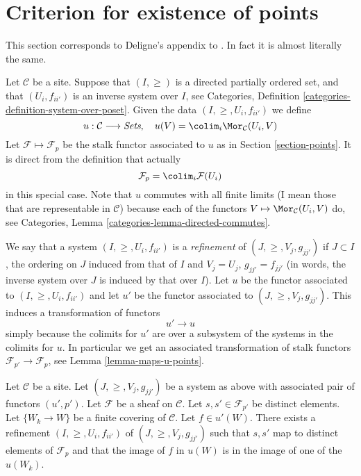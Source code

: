 \section{Criterion for existence of points}
\label{section-criterion-points}

\noindent
This section corresponds to Deligne's appendix to \cite[Expos\'e VI]{SGA4}.
In fact it is almost literally the same.

\medskip\noindent
Let $\mathcal{C}$ be a site.
Suppose that $(I, \geq)$ is a directed partially ordered set,
and that $(U_i, f_{ii'})$ is an inverse system over $I$, see
Categories, Definition \ref{categories-definition-system-over-poset}.
Given the data $(I, \geq, U_i, f_{ii'})$ we define
$$
u : \mathcal{C} \longrightarrow \textit{Sets}, \quad
u(V) = \colim_i \Mor_\mathcal{C}(U_i , V)
$$
Let $\mathcal{F} \mapsto \mathcal{F}_p$ be the stalk functor
associated to $u$ as in Section \ref{section-points}.
It is direct from the definition that actually
$$
\mathcal{F}_p = \colim_i \mathcal{F}(U_i)
$$
in this special case.
Note that $u$ commutes with all finite limits (I mean those that
are representable in $\mathcal{C}$) because
each of the functors $V \mapsto \Mor_\mathcal{C}(U_i , V)$
do, see Categories, Lemma \ref{categories-lemma-directed-commutes}.

\medskip\noindent
We say that a system $(I, \geq, U_i, f_{ii'})$
is a {\it refinement} of $(J, \geq, V_j, g_{jj'})$ if
$J \subset I$, the ordering on $J$ induced from that of $I$
and $V_j = U_j$, $g_{jj'} = f_{jj'}$ (in words, the inverse system
over $J$ is induced by that over $I$). Let $u$ be the functor
associated to $(I, \geq, U_i, f_{ii'})$ and let $u'$ be the
functor associated to $(J, \geq, V_j, g_{jj'})$.
This induces a transformation of functors
$$
u' \longrightarrow u
$$
simply because the colimits for $u'$ are over a subsystem
of the systems in the colimits for $u$.
In particular we get an associated transformation of
stalk functors $\mathcal{F}_{p'} \to \mathcal{F}_p$,
see Lemma \ref{lemma-maps-u-points}.

\begin{lemma}
\label{lemma-refine}
Let $\mathcal{C}$ be a site.
Let $(J, \geq, V_j, g_{jj'})$ be a system as above with associated
pair of functors $(u', p')$.
Let $\mathcal{F}$ be a sheaf on $\mathcal{C}$.
Let $s, s' \in \mathcal{F}_{p'}$ be distinct elements.
Let $\{W_k \to W\}$ be a finite covering of $\mathcal{C}$.
Let $f \in u'(W)$.
There exists a refinement $(I, \geq, U_i, f_{ii'})$
of $(J, \geq, V_j, g_{jj'})$ such that $s, s'$ map
to distinct elements of $\mathcal{F}_p$ and that
the image of $f$ in $u(W)$ is in the image of one of
the $u(W_k)$.
\end{lemma}


